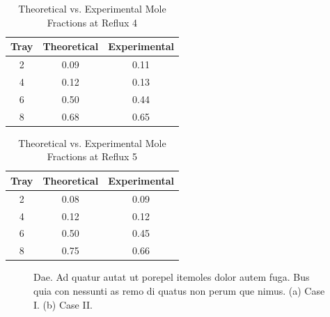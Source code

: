\documentclass[lettersize,journal]{IEEEtran}
\begin{document}
	
		
	\begin{table}[htbp]
		\centering
		\caption{Theoretical vs. Experimental Mole Fractions at Reflux 4}
		\label{tab:reflux4}
		\begin{tabular}{ccc}
			\toprule
			\textbf{Tray} & \textbf{Theoretical} & \textbf{Experimental} \\
			\midrule
			2 & 0.09 & 0.11 \\
			4 & 0.12 & 0.13 \\
			6 & 0.50 & 0.44 \\
			8 & 0.68 & 0.65 \\
			\bottomrule
		\end{tabular}
	\end{table}
		
	\begin{table}[htbp]
		\centering
		\caption{Theoretical vs. Experimental Mole Fractions at Reflux 5}
		\label{tab:reflux5}
		\begin{tabular}{ccc}
			\toprule
			\textbf{Tray} & \textbf{Theoretical} & \textbf{Experimental} \\
			\midrule
			2 & 0.08 & 0.09 \\
			4 & 0.12 & 0.12 \\
			6 & 0.50 & 0.45 \\
			8 & 0.75 & 0.66 \\
			\bottomrule
		\end{tabular}
	\end{table}
		
	
	
	
	
	
	\begin{figure}[!t]
		\centering
		\hfil
		\caption{Dae. Ad quatur autat ut porepel itemoles dolor autem fuga. Bus quia con nessunti as remo di quatus non perum que nimus. (a) Case I. (b) Case II.}
		
	\end{figure}
	
\end{document}
